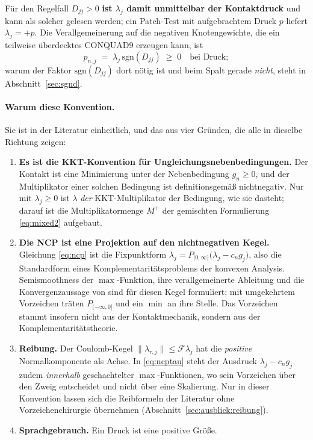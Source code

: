 \documentclass[a4paper,11pt]{article}
\def\bm#1{#1}%
\def\tilde#1{#1}%
\begin{document}
\noindent Für den Regelfall $\tilde D_{jj}>0$ \textbf{ist $\lambda_j$ damit unmittelbar der
Kontaktdruck} und kann als solcher gelesen werden; ein Patch-Test mit aufgebrachtem Druck $p$
liefert $\lambda_j=+p$. Die Verallgemeinerung auf die negativen Knotengewichte, die ein teilweise
überdecktes CONQUAD9 erzeugen kann, ist
\begin{equation}
p_{n,j} \;=\; \lambda_j\,\mathrm{sgn}(\tilde D_{jj}) \;\ge\; 0 \quad\text{bei Druck};
\label{eq:pn_def}
\end{equation}
warum der Faktor $\mathrm{sgn}(\tilde D_{jj})$ dort nötig ist und beim Spalt gerade \emph{nicht},
steht in Abschnitt~\ref{sec:sgnd}.

\paragraph{Warum diese Konvention.}
Sie ist in der Literatur einheitlich, und das aus vier Gründen, die alle in dieselbe Richtung
zeigen:
\begin{enumerate}\itemsep2pt
  \item \textbf{Es ist die KKT-Konvention für Ungleichungsnebenbedingungen.} Der Kontakt ist eine
        Minimierung unter der Nebenbedingung $g_n\ge0$, und der Multiplikator einer solchen
        Bedingung ist definitionsgemäß nichtnegativ. Nur mit $\lambda_j\ge0$ ist $\lambda$
        \emph{der} KKT-Multiplikator der Bedingung, wie sie dasteht; darauf ist die
        Multiplikatormenge $M^+$ der gemischten Formulierung \eqref{eq:mixed2} aufgebaut.
  \item \textbf{Die NCP ist eine Projektion auf den nichtnegativen Kegel.} Gleichung
        \eqref{eq:ncp} ist die Fixpunktform
        $\lambda_{j}=P_{[0,\infty)}\big(\lambda_{j}-c_n\tilde g_j\big)$, also die Standardform
        eines Komplementaritätsproblems der konvexen Analysis. Semismoothness der
        $\max$-Funktion, ihre verallgemeinerte Ableitung und die Konvergenzaussage von
        \citet{hik2002} sind für diesen Kegel formuliert; mit umgekehrtem Vorzeichen träten
        $P_{(-\infty,0]}$ und ein $\min$ an ihre Stelle. Das Vorzeichen stammt insofern nicht aus
        der Kontaktmechanik, sondern aus der Komplementaritätstheorie.
  \item \textbf{Reibung.} Der Coulomb-Kegel $\|\bm\lambda_{\tau,j}\|\le\mathcal F\lambda_{j}$ hat
        die \emph{positive} Normalkomponente als Achse. In \eqref{eq:ncptau} steht der Ausdruck
        $\lambda_{j}-c_n\tilde g_j$ zudem \emph{innerhalb} geschachtelter $\max$-Funktionen, wo
        sein Vorzeichen über den Zweig entscheidet und nicht über eine Skalierung. Nur in dieser
        Konvention lassen sich die Reibformeln der Literatur ohne Vorzeichenchirurgie übernehmen
        (Abschnitt~\ref{sec:ausblick:reibung}).
  \item \textbf{Sprachgebrauch.} Ein Druck ist eine positive Größe.
\end{enumerate}
\end{document}

